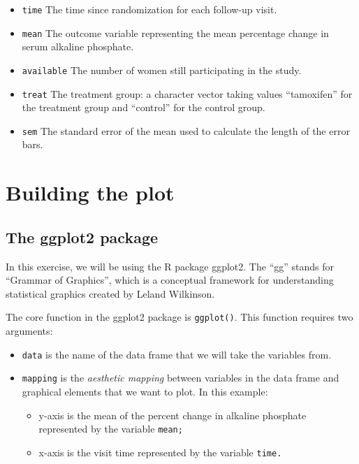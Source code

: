 \documentclass[
]{book}
\providecommand{\tightlist}{%
  \setlength{\itemsep}{0pt}\setlength{\parskip}{0pt}}
\begin{document}
\begin{itemize}
\tightlist
\item
  \texttt{time} The time since randomization for each follow-up visit.
\item
  \texttt{mean} The outcome variable representing the mean percentage change in serum alkaline phosphate.
\item
  \texttt{available} The number of women still participating in the study.
\item
  \texttt{treat} The treatment group: a character vector taking values ``tamoxifen'' for the treatment group and ``control'' for the control group.
\item
  \texttt{sem} The standard error of the mean used to calculate the length of the error bars.
\end{itemize}

\section{Building the plot}\label{building-the-plot}

\subsection{The ggplot2 package}\label{the-ggplot2-package}

In this exercise, we will be using the R package ggplot2. The ``gg'' stands for ``Grammar of Graphics'', which is a conceptual framework for understanding statistical graphics created by Leland Wilkinson.

The core function in the ggplot2 package is \texttt{ggplot()}. This function requires two arguments:

\begin{itemize}
\tightlist
\item
  \texttt{data} is the name of the data frame that we will take the variables from.
\item
  \texttt{mapping} is the \emph{aesthetic mapping} between variables in the data frame and graphical elements that we want to plot. In this example:

  \begin{itemize}
  \tightlist
  \item
    y-axis is the mean of the percent change in alkaline phosphate represented by the variable \texttt{mean;}
  \item
    x-axis is the visit time represented by the variable \texttt{time.}
  \end{itemize}
\end{itemize}
\end{document}
